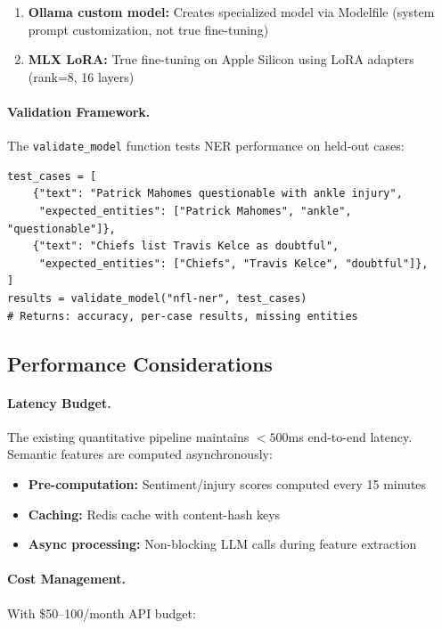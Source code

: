 \begin{enumerate}[itemsep=2pt,parsep=0pt]
    \item \textbf{Ollama custom model:} Creates specialized model via Modelfile (system prompt customization, not true fine-tuning)
    \item \textbf{MLX LoRA:} True fine-tuning on Apple Silicon using LoRA adapters (rank=8, 16 layers)
\end{enumerate}

\paragraph{Validation Framework.}
The \texttt{validate\_model} function tests NER performance on held-out cases:

\begin{verbatim}
test_cases = [
    {"text": "Patrick Mahomes questionable with ankle injury",
     "expected_entities": ["Patrick Mahomes", "ankle", "questionable"]},
    {"text": "Chiefs list Travis Kelce as doubtful",
     "expected_entities": ["Chiefs", "Travis Kelce", "doubtful"]},
]
results = validate_model("nfl-ner", test_cases)
# Returns: accuracy, per-case results, missing entities
\end{verbatim}

\subsection{Performance Considerations}

\paragraph{Latency Budget.}
The existing quantitative pipeline maintains $<500$ms end-to-end latency. Semantic features are computed asynchronously:

\begin{itemize}[itemsep=2pt,parsep=0pt]
    \item \textbf{Pre-computation:} Sentiment/injury scores computed every 15 minutes
    \item \textbf{Caching:} Redis cache with content-hash keys
    \item \textbf{Async processing:} Non-blocking LLM calls during feature extraction
\end{itemize}

\paragraph{Cost Management.}
With \$50--100/month API budget:

